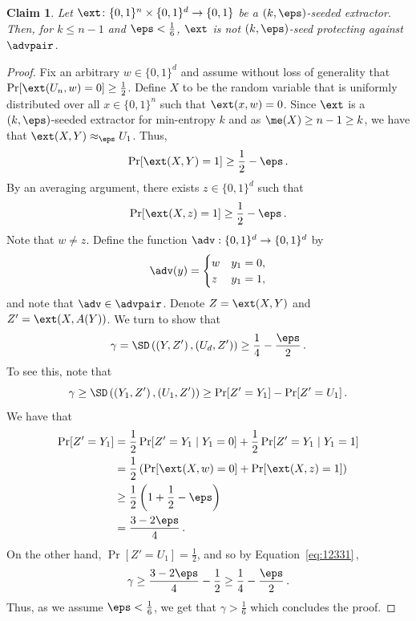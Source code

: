 \documentclass[11pt]{article}
\numberwithin{equation}{section}
\newtheorem{claim}[theorem]{Claim}
\theoremstyle{definition}
\theoremstyle{plain}
\begin{document}
\begin{claim}\label{c:lower bound image two intro}
	Let $\ext \colon \{0,1\}^n \times \{0,1\}^d \to \{0,1\}$ be a $(k,\eps)$-seeded extractor. Then, for $k \le n-1$ and $\eps < \frac1{6}$, $\ext$ is not $(k,\eps)$-seed protecting against $\advpair$.
\end{claim}
\begin{proof}
	Fix an arbitrary $w \in \{0,1\}^d$ and assume without loss of generality that $\Pr[\ext(U_n,w) = 0] \ge \frac1{2}$. Define $X$ to be the random variable that is uniformly distributed over all $x \in \{0,1\}^n$ such that $\ext(x,w ) = 0$. Since $\ext$ is a 
%
$(k,\eps)$-seeded extractor   %
for min-entropy $k$ and as $\me(X) \ge n-1 \ge k$, we have that $\ext(X,Y) \approx_\eps U_1$. Thus,
	$$
	\Pr[\ext(X,Y) = 1] \ge \frac1{2} - \eps\,.
	$$
	By an averaging argument, there exists $z \in \{0,1\}^d$ such that
	$$
	\Pr[\ext(X,z) = 1] \ge \frac1{2} - \eps\,.
	$$
	Note that $w \neq z$. Define the function $\adv : \{0,1\}^d \to \{0,1\}^d$ by
	\begin{align*}
	\adv(y) = \begin{cases}
	w & y_1 = 0,\\
	z & y_1 = 1,
	\end{cases}
	\end{align*}
	and note that $\adv \in \advpair$. Denote $Z = \ext(X,Y)$ and $Z' = \ext(X,A(Y))$.	We turn to show that
	$$
	\gamma = \SD\left(\left(Y,Z'\right) , \left(U_d, Z'\right)\right) \ge \frac1{4} - \frac{\eps}{2}\,.
	$$
	To see this, note that
	\begin{equation}\label{eq:12331}
	\gamma \ge \SD\left(\left(Y_1, Z'\right) , \left(U_1,Z'\right)\right)
	\ge \Pr[Z' = Y_1] - \Pr[Z' = U_1]\,.
	\end{equation}
	We have that
	\begin{align*}
	\Pr[Z' = Y_1] &=
	\frac1{2} \Pr[Z' = Y_1 \mid Y_1 = 0] + \frac1{2} \Pr[Z' = Y_1 \mid Y_1 = 1] \\
	&= \frac1{2} \left(\Pr[\ext(X,w) = 0] + \Pr[\ext(X,z) = 1] \right) \\
	&\ge \frac1{2} \left(1 + \frac1{2} - \eps\right) \\
	&= \frac{3-2\eps}{4}\,.
	\end{align*}
	On the other hand, $\Pr[Z' = U_1] = \frac1{2}$, and so by Equation~\eqref{eq:12331}\,, $$
	\gamma \ge \frac{3-2\eps}{4} - \frac1{2} \ge \frac1{4} - \frac{\eps}{2}\,.
	$$
	Thus, as we assume $\eps < \frac1{6}$, we get that
	$\gamma > \frac1{6}$ which concludes the proof.
\end{proof}
\end{document}
